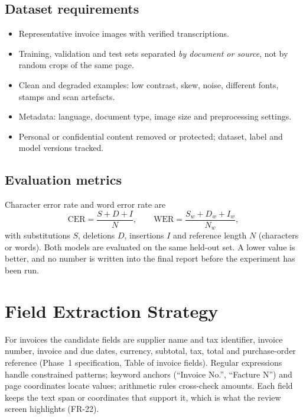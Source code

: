 \documentclass[11pt,a4paper]{report}
\begin{document}
\subsection{Dataset requirements}
\begin{itemize}
\item Representative invoice images with verified transcriptions.
\item Training, validation and test sets separated \emph{by document or source}, not by random crops of the same page.
\item Clean and degraded examples: low contrast, skew, noise, different fonts, stamps and scan artefacts.
\item Metadata: language, document type, image size and preprocessing settings.
\item Personal or confidential content removed or protected; dataset, label and model versions tracked.
\end{itemize}

\subsection{Evaluation metrics}
Character error rate and word error rate are
\[
\mathrm{CER}=\frac{S+D+I}{N},\qquad \mathrm{WER}=\frac{S_w+D_w+I_w}{N_w},
\]
with substitutions $S$, deletions $D$, insertions $I$ and reference length $N$ (characters or words). Both models are evaluated on the same held-out set. A lower value is better, and no number is written into the final report before the experiment has been run.

\section{Field Extraction Strategy}
For invoices the candidate fields are supplier name and tax identifier, invoice number, invoice and due dates, currency, subtotal, tax, total and purchase-order reference (Phase~1 specification, Table of invoice fields). Regular expressions handle constrained patterns; keyword anchors (``Invoice No.'', ``Facture N\textdegree'') and page coordinates locate values; arithmetic rules cross-check amounts. Each field keeps the text span or coordinates that support it, which is what the review screen highlights (FR-22).
\end{document}
